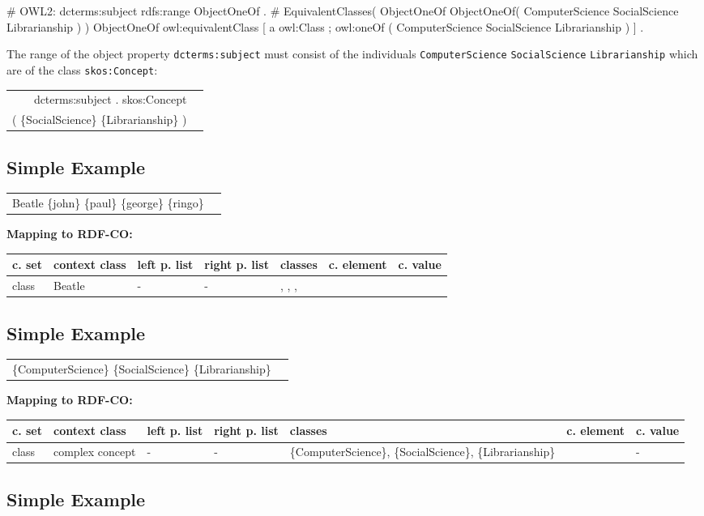 \documentclass{llncs}
\newcommand{\ms}[1]{\texttt{#1}}
\newenvironment{gcotable}{
  \scriptsize
  \sffamily
  \vspace{0cm}
	\begin{center}
	\textbf{\vspace{0.4cm}Mapping to RDF-CO:} \\
  \begin{tabular}{l|l|l|l|l|l|l}
	\hline
  \textbf{c. set} & \textbf{context class} & \textbf{left p. list} & \textbf{right p. list} & \textbf{classes} & \textbf{c. element} & \textbf{c. value} \\
  \hline

}{
  \hline
  \end{tabular}
	\end{center}
}
\newenvironment{DL}{
\vspace{0cm}
	\begin{center}
  \begin{tabular}{r l}

}{
  \end{tabular}
	\end{center}
}
\begin{document}
\begin{ex}
# OWL2:
dcterms:subject rdfs:range ObjectOneOf . 
# EquivalentClasses( ObjectOneOf ObjectOneOf( ComputerScience SocialScience Librarianship ) )
ObjectOneOf owl:equivalentClass [ 
    a owl:Class ;
    owl:oneOf ( ComputerScience SocialScience Librarianship ) ] .
\end{ex}

The range of the object property \ms{dcterms:subject} must consist of the individuals \ms{ComputerScience} \ms{SocialScience} \ms{Librarianship} which are of the class \ms{skos:Concept}:

\begin{DL}
   dcterms:subject . skos:Concept  \\
(   \{SocialScience\}  \{Librarianship\} ) \\
\end{DL}

\subsection{Simple Example}

\begin{DL}
Beatle  \{john\}  \{paul\}  \{george\}  \{ringo\} \\
\end{DL}

\begin{gcotable}
class & Beatle & - & - & , , ,  &  \\
\end{gcotable}

\subsection{Simple Example}

\begin{DL}
\{ComputerScience\}  \{SocialScience\}  \{Librarianship\} \\
\end{DL}

\begin{gcotable}
class & complex concept & - & - & \{ComputerScience\}, \{SocialScience\}, \{Librarianship\} &  & - \\
\end{gcotable}

\subsection{Simple Example}
\end{document}
